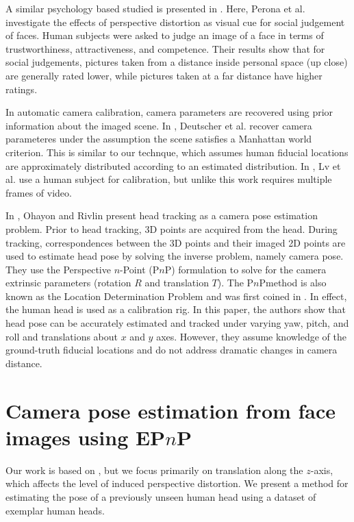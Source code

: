 \documentclass[runningheads]{llncs}
\newcommand {\PnP} {P$n$P}
\newcommand {\EPnP} {EP$n$P}
\begin{document}
A similar psychology based studied is presented in \cite{perona2007new,bryan2012perspective}. 
Here, Perona et al. investigate the effects of perspective distortion as visual cue for social judgement of faces.  
Human subjects were asked to judge an image of a face in terms of trustworthiness, attractiveness, and competence.  
Their results show that for social judgements, pictures taken from a distance inside personal space (up close) are generally rated lower, while pictures taken at a far distance have higher ratings.

In automatic camera calibration, camera parameters are recovered using prior information about the imaged scene.
In \cite{deutscher}, Deutscher et al. recover camera parameteres under the assumption the scene satisfies a Manhattan world criterion.
This is similar to our technque, which assumes human fiducial locations are approximately distributed according to an estimated distribution. 
In \cite{lv2006}, Lv et al. use a human subject for calibration, but unlike this work requires multiple frames of video.

In \cite{ohayon2006robust}, Ohayon and Rivlin present head tracking as a camera pose estimation problem.  
Prior to head tracking, 3D points are acquired from the head.  
During tracking, correspondences between the 3D points and their imaged 2D points are used to estimate head pose by solving the inverse problem, namely camera pose. 
They use the Perspective $n$-Point (\PnP) formulation to solve for the camera extrinsic parameters (rotation $R$ and translation $T$).  
The \PnP method is also known as the Location Determination Problem and was first coined in \cite{ransac}.  
In effect, the human head is used as a calibration rig.  
In this paper, the authors show that head pose can be accurately estimated and tracked under varying yaw, pitch, and roll and translations about $x$ and $y$ axes. 
However, they assume knowledge of the ground-truth fiducial locations and do not address dramatic changes in camera distance.

\section{Camera pose estimation from face images using \EPnP}

Our work is based on \cite{ohayon2006robust}, but we focus primarily on translation along the $z$-axis, which affects the level of induced perspective distortion.  
We present a method for estimating the pose of a previously unseen human head using a dataset of exemplar human heads. 
\end{document}
